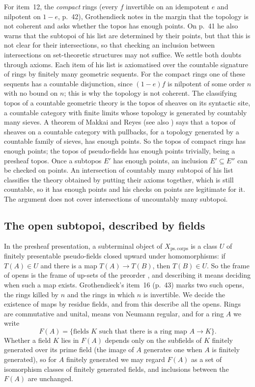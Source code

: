 For item~12, the \emph{compact} rings (every $f$ invertible on an idempotent $e$ and nilpotent on $1-e$, p.~42), Grothendieck notes in the margin that the topology is not coherent and asks whether the topos has enough points. On p.~41 he also warns that the subtopoi of his list are determined by their points, but that this is not clear for their intersections, so that checking an inclusion between intersections on set-theoretic structures may not suffice. We settle both doubts through axioms. Each item of his list is axiomatised over the countable signature of rings by finitely many geometric sequents. For the compact rings one of these sequents has a countable disjunction, since $(1-e)f$ is nilpotent of some order $n$ with no bound on $n$; this is why the topology is not coherent. The classifying topos of a countable geometric theory is the topos of sheaves on its syntactic site, a countable category with finite limits whose topology is generated by countably many sieves. A theorem of Makkai and Reyes \cite[Thm~6.2.4]{makkai-reyes} (see also \cite[Cor.~3.3.10]{diliberti-rogers}) says that a topos of sheaves on a countable category with pullbacks, for a topology generated by a countable family of sieves, has enough points. So the topos of compact rings has enough points; the topos of pseudo-fields has enough points trivially, being a presheaf topos. Once a subtopos $E'$ has enough points, an inclusion $E'\subseteq E''$ can be checked on points. An intersection of countably many subtopoi of his list classifies the theory obtained by putting their axioms together, which is still countable, so it has enough points and his checks on points are legitimate for it. The argument does not cover intersections of uncountably many subtopoi.

\subsection{The open subtopoi, described by fields}\label{sec:pseudofields-opens}

In the presheaf presentation, a subterminal object of $X_{\mathrm{ps.\,corps}}$ is a class $U$ of finitely presentable pseudo-fields closed upward under homomorphisms: if $T(A)\in U$ and there is a map $T(A)\to T(B)$, then $T(B)\in U$. So the frame of opens is the frame of up-sets of the preorder , and describing it means deciding when such a map exists. Grothendieck's item~16 (p.~43) marks two such opens, the rings killed by $n$ and the rings in which $n$ is invertible. We decide the existence of maps by residue fields, and from this describe all the opens. Rings are commutative and unital,  means von Neumann regular, and for a ring $A$ we write
\[
F(A) = \{\text{fields } K \text{ such that there is a ring map } A\to K\}.
\]
Whether a field $K$ lies in $F(A)$ depends only on the subfields of $K$ finitely generated over its prime field (the image of $A$ generates one when $A$ is finitely generated), so for $A$ finitely generated we may regard $F(A)$ as a set of isomorphism classes of finitely generated fields, and inclusions between the $F(A)$ are unchanged.


